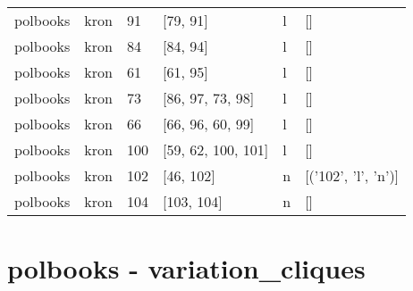 \begin{tabular}{llllll}
polbooks & kron & 91 & [79, 91] & l & [] \\
polbooks & kron & 84 & [84, 94] & l & [] \\
polbooks & kron & 61 & [61, 95] & l & [] \\
polbooks & kron & 73 & [86, 97, 73, 98] & l & [] \\
polbooks & kron & 66 & [66, 96, 60, 99] & l & [] \\
polbooks & kron & 100 & [59, 62, 100, 101] & l & [] \\
polbooks & kron & 102 & [46, 102] & n & [('102', 'l', 'n')] \\
polbooks & kron & 104 & [103, 104] & n & [] \\
\bottomrule
\end{tabular}


\section*{polbooks - variation_cliques}
